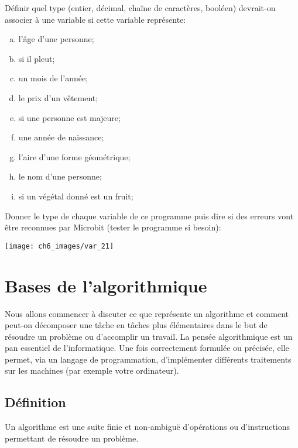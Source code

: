 \documentclass[11pt, a4paper]{book}
\begin{document}
\begin{exercice}
Définir quel type (entier, décimal, chaîne de caractères, booléen) devrait-on associer à une variable si cette variable représente:
\begin{enumerate}[a)]
\item l'âge d'une personne;
\item si il pleut;
\item un mois de l'année;
\item le prix d'un vêtement;
\item si une personne est majeure;
\item une année de naissance;
\item l'aire d'une forme géométrique;
\item le nom d'une personne;
\item si un végétal donné est un fruit;
\end{enumerate}
\end{exercice}



\begin{exercice}
Donner le type de chaque variable de ce programme puis dire si des erreurs vont être reconnues par Microbit (tester le programme si besoin):
\begin{center}
\texttt{[image: ch6\_images/var\_21]}
\end{center}

\end{exercice}

\section{Bases de l'algorithmique}

Nous allons commencer à discuter ce que représente un algorithme et comment peut-on décomposer une tâche en tâches plus élémentaires dans le but de résoudre un problème ou d'accomplir un travail. La pensée algorithmique est un pan essentiel de l'informatique. Une fois correctement formulée ou précisée, elle permet, via un langage de programmation, d'implémenter différents traitements sur les machines (par exemple votre ordinateur).


\subsection{Définition}
\begin{defi}
Un algorithme est une suite finie et non-ambiguë d'opérations ou d'instructions permettant de résoudre un problème.

\end{defi}
\end{document}
